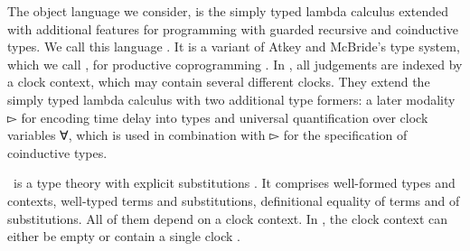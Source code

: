 
The object language we consider, is the simply typed lambda calculus
extended with additional features for programming with guarded recursive and coinductive
types. We call this language \GTT. It is a variant of Atkey and McBride's type system, which we call \AM, for
productive coprogramming \cite{atkey2013productive}. In \AM, all judgements are indexed by a clock context,
which may contain several different clocks. They extend the simply typed
lambda calculus with two additional type formers: a later modality ▻ for
encoding time delay into types and universal quantification over clock
variables ∀, which is used in combination with ▻ for the specification of coinductive types.

\GTT\ is a type theory with explicit substitutions \cite{AbadiCCL91}. It comprises
well-formed types and contexts, well-typed terms and substitutions,
definitional equality of terms and of substitutions. All of them depend on a clock context.
In \GTT, the clock context can either be empty or contain a single clock .

